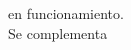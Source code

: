 \documentclass[10pt,a4paper]{article} %
\begin{document}
                                                                                                                                                                                                                                                                                                                                                                                                                                                                                                                                                                        en
                                                                                                                                                                                                                                                                                                                                                                                                                                                                                                                                                                        funcionamiento.
                                                                                                                                                                                                                                                                                                                                                                                                                                                                                                                                                                        \\
                                                                                                                                                                                                                                                                                                                                                                                                                                                                                                                                                                            Se
                                                                                                                                                                                                                                                                                                                                                                                                                                                                                                                                                                            complementa
\end{document}

